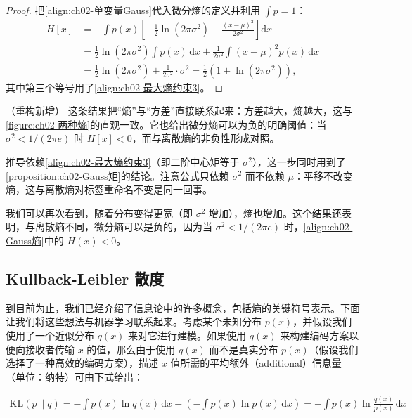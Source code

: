 \documentclass[../../main.tex]{subfiles}
\begin{document}
\begin{proof}
把\eqref{align:ch02-单变量Gauss}代入微分熵的定义并利用 $\int p=1$：
\begin{align*}
  H[x] &= -\int p(x)\left[-\frac{1}{2}\ln(2\pi\sigma^{2}) - \frac{(x-\mu)^{2}}{2\sigma^{2}}\right]\mathrm{d}x \\
  &= \frac{1}{2}\ln(2\pi\sigma^{2})\int p(x)\,\mathrm{d}x + \frac{1}{2\sigma^{2}}\int(x-\mu)^{2}p(x)\,\mathrm{d}x \\
  &= \frac{1}{2}\ln(2\pi\sigma^{2}) + \frac{1}{2\sigma^{2}}\cdot\sigma^{2} = \frac{1}{2}\left(1+\ln(2\pi\sigma^{2})\right),
\end{align*}
其中第三个等号用了\eqref{align:ch02-最大熵约束3}。
\end{proof}

\begin{remark}（重构新增）
这条结果把“熵”与“方差”直接联系起来：方差越大，熵越大，这与\cref{figure:ch02-两种熵}的直观一致。它也给出微分熵可以为负的明确阈值：当 $\sigma^{2}<1/(2\pi e)$ 时 $H[x]<0$，而与离散熵的非负性形成对照。

推导依赖\eqref{align:ch02-最大熵约束3}（即二阶中心矩等于 $\sigma^{2}$），这一步同时用到了\cref{proposition:ch02-Gauss矩}的结论。注意公式只依赖 $\sigma^{2}$ 而不依赖 $\mu$：平移不改变熵，这与离散熵对标签重命名不变是同一回事。
\end{remark}

我们可以再次看到，随着分布变得更宽（即 $\sigma^{2}$ 增加），熵也增加。这个结果还表明，与离散熵不同，微分熵可以是负的，因为当 $\sigma^{2}<1/(2\pi e)$ 时，\eqref{align:ch02-Gauss熵}中的 $H(x)<0$。

\subsection{Kullback-Leibler 散度}\label{subsection:ch02-KL散度}

到目前为止，我们已经介绍了信息论中的许多概念，包括熵的关键符号表示。下面让我们将这些想法与机器学习联系起来。考虑某个未知分布 $p(x)$，并假设我们使用了一个近似分布 $q(x)$ 来对它进行建模。如果使用 $q(x)$ 来构建编码方案以便向接收者传输 $x$ 的值，那么由于使用 $q(x)$ 而不是真实分布 $p(x)$（假设我们选择了一种高效的编码方案），描述 $x$ 值所需的平均额外（additional）信息量（单位：纳特）可由下式给出：

\begin{align}
  \mathrm{KL}(p\|q) = -\int p(x)\ln q(x)\,\mathrm{d}x - \left(-\int p(x)\ln p(x)\,\mathrm{d}x\right) = -\int p(x)\ln\frac{q(x)}{p(x)}\,\mathrm{d}x
  \label{align:ch02-kl散度}
\end{align}
\end{document}
